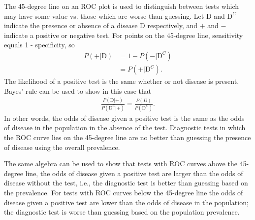 The 45-degree line on an ROC plot is used to distinguish between tests which may have some value vs. those which are worse than guessing.  Let $\text{D}$ and $\text{D}^C$ indicate the presence or absence of a disease D respectively, and $+$ and $-$ indicate a positive or negative test.  For points on the 45-degree line, sensitivity equals 1 - specificity, so 
\begin{align*}
P(+ | \text{D}) &= 1 - P(- | \text{D}^C) \\
  &= P(+ | \text{D}^C).
\end{align*}
The likelihood of a positive test is the same whether or not disease is present.  Bayes' rule can be used to show in this case that 
\begin{align*}
   \frac{P(\text{D}| +)}{P(\text{D}^C | +)} =
      \frac{P(D)}{P(\text{D}^C)}.
\end{align*}
In other words, the odds of disease given a positive test is the same as the odds of disease in the population in the absence of the test.  Diagnostic tests in which the ROC curve lies on the 45-degree line are no better than guessing the presence of disease using the overall prevalence.

The same algebra can be used to show that tests with ROC curves above the 45-degree line, the odds of disease given a positive test are larger than the odds of disease without the test, i.e., the diagnostic test is better than guessing based on the prevalence.   For tests with ROC curves below the 45-degree line the odds of disease given a positive test are lower than the odds of disease in the population; the diagnostic test is worse than guessing based on the population prevalence.

